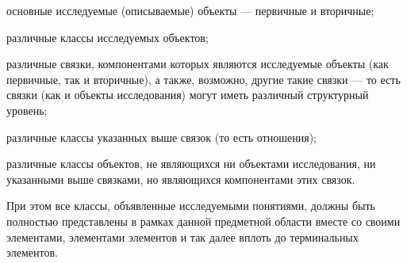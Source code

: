 \begin{SCn}
\begin{scnsubstruct}
\begin{scnsubstruct}
{                \begin{scnitemize}
                    \item \textnormal{основные исследуемые (описываемые) объекты --- первичные и вторичные;}
                    \item \textnormal{различные классы исследуемых объектов;}
                    \item \textnormal{различные связки, компонентами которых являются исследуемые объекты (как первичные, так и вторичные), а также, возможно, другие такие связки --- то есть связки (как и объекты исследования) могут иметь различный структурный уровень;}
                    \item \textnormal{различные классы указанных выше связок (то есть отношения);}
                    \item \textnormal{различные классы объектов, не являющихся ни объектами исследования, ни указанными выше связками, но являющихся компонентами этих связок.}
                \end{scnitemize}
                При этом все классы, объявленные исследуемыми понятиями, должны быть полностью представлены в рамках данной предметной области вместе со своими элементами, элементами элементов и так далее вплоть до терминальных элементов.}
\end{scnsubstruct}
\end{scnsubstruct}
\end{SCn}
